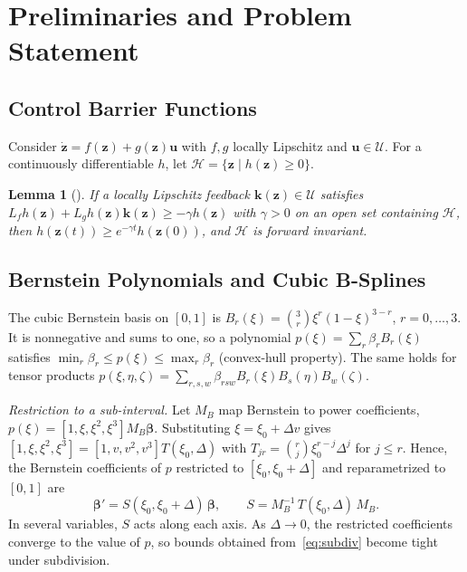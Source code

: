 \documentclass[journal]{IEEEtran}
\newtheorem{lemma}{Lemma}
\theoremstyle{definition}
\begin{document}
\section{Preliminaries and Problem Statement}\label{sec:prelim}

\subsection{Control Barrier Functions}
Consider $\dot{\mathbf z}=f(\mathbf z)+g(\mathbf z)\mathbf u$ with $f,g$ locally Lipschitz and
$\mathbf u\in\mathcal U$. For a continuously differentiable $h$, let
$\mathcal H=\{\mathbf z\mid h(\mathbf z)\ge0\}$.

\begin{lemma}[\cite{ames2019cbf}]\label{lem:cbf}
If a locally Lipschitz feedback $\mathbf k(\mathbf z)\in\mathcal U$ satisfies
$L_fh(\mathbf z)+L_gh(\mathbf z)\mathbf k(\mathbf z)\ge-\gamma h(\mathbf z)$ with $\gamma>0$ on an
open set containing $\mathcal H$, then $h(\mathbf z(t))\ge e^{-\gamma t}h(\mathbf z(0))$, and
$\mathcal H$ is forward invariant.
\end{lemma}

\subsection{Bernstein Polynomials and Cubic B-Splines}
The cubic Bernstein basis on $[0,1]$ is $B_r(\xi)=\binom{3}{r}\xi^r(1-\xi)^{3-r}$, $r=0,\dots,3$.
It is nonnegative and sums to one, so a polynomial $p(\xi)=\sum_r\beta_rB_r(\xi)$ satisfies
$\min_r\beta_r\le p(\xi)\le\max_r\beta_r$ (convex-hull property). The same holds for tensor
products $p(\xi,\eta,\zeta)=\sum_{r,s,w}\beta_{rsw}B_r(\xi)B_s(\eta)B_w(\zeta)$.

\emph{Restriction to a sub-interval.} Let $M_B$ map Bernstein to power coefficients,
$p(\xi)=[1,\xi,\xi^2,\xi^3]M_B\boldsymbol\beta$. Substituting $\xi=\xi_0+\Delta v$ gives
$[1,\xi,\xi^2,\xi^3]=[1,v,v^2,v^3]T(\xi_0,\Delta)$ with $T_{jr}=\binom{r}{j}\xi_0^{r-j}\Delta^j$ for
$j\le r$. Hence, the Bernstein coefficients of $p$ restricted to $[\xi_0,\xi_0+\Delta]$ and
reparametrized to $[0,1]$ are
\begin{equation}\label{eq:subdiv}
\boldsymbol\beta'=S(\xi_0,\xi_0+\Delta)\,\boldsymbol\beta,\qquad
S=M_B^{-1}\,T(\xi_0,\Delta)\,M_B .
\end{equation}
In several variables, $S$ acts along each axis. As $\Delta\to0$, the restricted coefficients
converge to the value of $p$, so bounds obtained from~\eqref{eq:subdiv} become tight under
subdivision.
\end{document}
